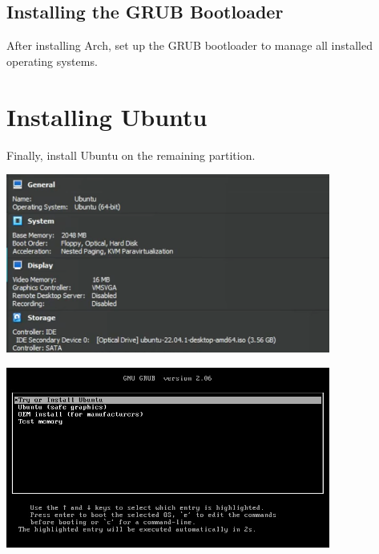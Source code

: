 \documentclass[a4paper]{article}
\begin{document}
\subsection{Installing the GRUB Bootloader}
After installing Arch, set up the GRUB bootloader to manage all installed operating systems.

\section{Installing Ubuntu}
Finally, install Ubuntu on the remaining partition.

\begin{center}
    \includegraphics[width=0.8\textwidth]{a.png} %
\end{center}
\begin{center}
    \includegraphics[width=0.8\textwidth]{39.jpeg} %
\end{center}
\end{document}
